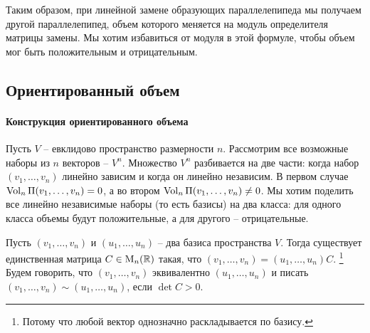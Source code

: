 Таким образом, при линейной замене образующих параллелепипеда мы получаем другой параллелепипед, объем которого меняется на модуль определителя матрицы замены.
Мы хотим избавиться от модуля в этой формуле, чтобы объем мог быть положительным и отрицательным.

\subsection{Ориентированный объем}

\paragraph{Конструкция ориентированного объема}

Пусть $V$ -- евклидово пространство размерности $n$.
Рассмотрим все возможные наборы из $n$ векторов -- $V^n$.
Множество $V^n$ разбивается на две части: когда набор $(v_1,\ldots,v_n)$ линейно зависим и когда он линейно независим.
В первом случае $\operatorname{Vol}_n\Pi(v_1,\ldots,v_n) = 0$, а во втором $\operatorname{Vol}_n\Pi(v_1,\ldots,v_n)\neq 0$.
Мы хотим поделить все линейно независимые наборы (то есть базисы) на два класса: для одного класса объемы будут положительные, а для другого -- отрицательные.

\begin{definition}
Пусть $(v_1,\ldots,v_n)$ и $(u_1,\ldots,u_n)$ -- два базиса пространства $V$.
Тогда существует единственная матрица $C\in \operatorname{M}_{n}(\mathbb R)$ такая, что $(v_1,\ldots,v_n) = (u_1,\ldots,u_n)C$.%
\footnote{Потому что любой вектор однозначно раскладывается по базису.}
Будем говорить, что $(v_1,\ldots,v_n)$ эквивалентно $(u_1,\ldots,u_n)$ и писать $(v_1,\ldots,v_n)\sim(u_1,\ldots,u_n)$, если $\det C > 0$.
\end{definition}

